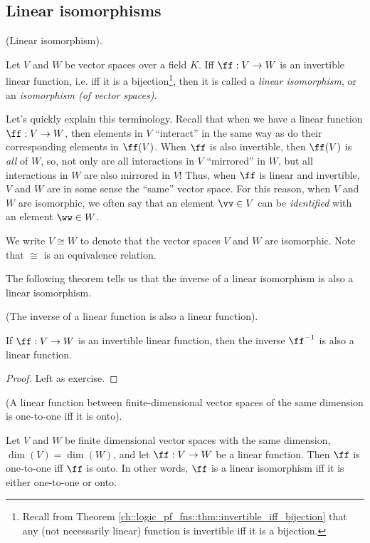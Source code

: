 \newpage

\subsection*{Linear isomorphisms}

\begin{defn}
\label{ch::lin_alg::defn::linear_iso}
    (Linear isomorphism).
    
    Let $V$ and $W$ be vector spaces over a field $K$. Iff $\ff:V \rightarrow W$ is an invertible linear function, i.e. iff it is a bijection\footnote{Recall from Theorem \ref{ch::logic_pf_fns::thm::invertible_iff_bijection} that any (not necessarily linear) function is invertible iff it is a bijection.}, then it is called a \textit{linear isomorphism}, or an \textit{isomorphism (of vector spaces)}.
    
    Let's quickly explain this terminology. Recall that when we have a linear function $\ff:V \rightarrow W$, then elements in $V$ ``interact'' in the same way as do their corresponding elements in $\ff(V)$. When $\ff$ is also invertible, then $\ff(V)$ is \textit{all} of $W$, so, not only are all interactions in $V$ ``mirrored'' in $W$, but all interactions in $W$ are also mirrored in $V$! Thus, when $\ff$ is linear and invertible, $V$ and $W$ are in some sense the ``same'' vector space. For this reason, when $V$ and $W$ are isomorphic, we often say that an element $\vv \in V$ can be \textit{identified} with an element $\ww \in W$.
    
    We write $V \cong W$ to denote that the vector spaces $V$ and $W$ are isomorphic. Note that $\cong$ is an equivalence relation.
\end{defn}

The following theorem tells us that the inverse of a linear isomorphism is also a linear isomorphism.

\begin{theorem}
    (The inverse of a linear function is also a linear function).
    
    If $\ff:V \rightarrow W$ is an invertible linear function, then the inverse $\ff^{-1}$ is also a linear function.
\end{theorem}

\begin{proof}
     Left as exercise.
\end{proof}

\begin{theorem}
    \label{ch::lin_alg::thm::linear_fn_1-1_iff_onto}
    
    (A linear function between finite-dimensional vector spaces of the same dimension is one-to-one iff it is onto).
    
    Let $V$ and $W$ be finite dimensional vector spaces with the same dimension, $\dim(V) = \dim(W)$, and let ${\ff:V \rightarrow W}$ be a linear function. Then $\ff$ is one-to-one iff $\ff$ is onto. In other words, $\ff$ is a linear isomorphism iff it is either one-to-one or onto.
\end{theorem}

